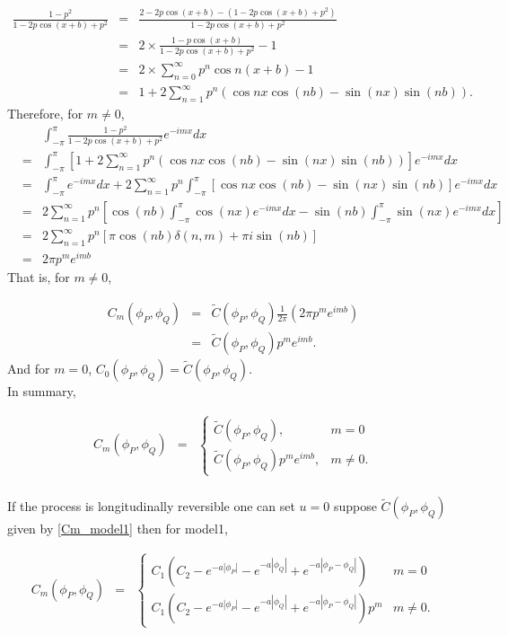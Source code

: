\begin{eqnarray*}
	\frac{1-p^2}{1 - 2p \cos(x+b)+p^2} &=& \frac{2-2p\cos(x+b)-(1-2p \cos(x+b)+p^2)}{1-2p \cos(x+b)+p^2}\\
	&=& 2\times \frac{1-p\cos(x+b)}{1-2p \cos(x+b)+p^2}-1 \\
	&=& 2\times \sum_{n=0}^{\infty}p^n\cos n(x+b)-1  \\
	&=& 1 + 2 \sum_{n=1}^{\infty}p^n (\cos nx \cos(nb) - \sin(nx) \sin(nb)).
\end{eqnarray*}
Therefore, for $m \ne 0$,
\begin{eqnarray*}
	& & \int_{-\pi}^\pi \frac{1-p^2}{1 - 2p \cos(x+b)+p^2} e^{-imx}dx \\
	&=& \int_{-\pi}^\pi \left[1 + 2 \sum_{n=1}^{\infty}p^n (\cos nx \cos(nb) - \sin(nx) \sin(nb))\right]  e^{-imx}dx \\
	&=& \int_{-\pi}^\pi e^{-imx}dx + 2 \sum_{n=1}^{\infty}p^n \int_{-\pi}^\pi \left[\cos nx \cos(nb) - \sin(nx) \sin(nb)\right]  e^{-imx}dx \\
	&=& 2 \sum_{n=1}^{\infty}p^n \left[\cos(nb)  \int_{-\pi}^\pi \cos(nx) e^{-imx} dx - \sin(nb)  \int_{-\pi}^\pi \sin(nx) e^{-imx}dx \right] \\
	&=& 2 \sum_{n=1}^{\infty}p^n \left[ \pi \cos(nb) \delta(n, m) + \pi i\sin(nb)\right] \\
	&=& 2\pi p^m e^{imb}
\end{eqnarray*}
That is, for $m \ne 0$,

\begin{eqnarray*}
	C_m(\phi_P, \phi_Q)  &=& \tilde{C}(\phi_P, \phi_Q) \frac{1}{2\pi} (2\pi p^m e^{imb}) \\
	&=& \tilde{C}(\phi_P, \phi_Q) p^m e^{imb}.
\end{eqnarray*}
And for $m = 0$, $C_0(\phi_P, \phi_Q) = \tilde{C}(\phi_P, \phi_Q)$.\\

In summary,

\begin{eqnarray*}
	C_m(\phi_P, \phi_Q) &=& \left\{ \begin{array}{ll}
	\tilde{C}(\phi_P, \phi_Q), & m = 0 \\
	\tilde{C}(\phi_P, \phi_Q)p^m e^{imb}, & m \ne 0.
	\end{array}
	\right.\\
\end{eqnarray*}

If the process is longitudinally reversible one can set $u=0$ suppose $\tilde{C}(\phi_P, \phi_Q)$ given by \ref{Cm_model1} then \Cm for model1,

\begin{eqnarray*}
	C_m(\phi_P, \phi_Q) &=& \left\{ \begin{array}{ll}
	C_1\left(C_2 - e^{-a|\phi_P|} - e^{-a|\phi_Q|} + e^{-a|\phi_P - \phi_Q|}\right)  & m = 0 \\
	C_1\left(C_2 - e^{-a|\phi_P|} - e^{-a|\phi_Q|} + e^{-a|\phi_P - \phi_Q|}\right)p^m & m \ne 0.
	\end{array}
	\right.
\end{eqnarray*}


%
